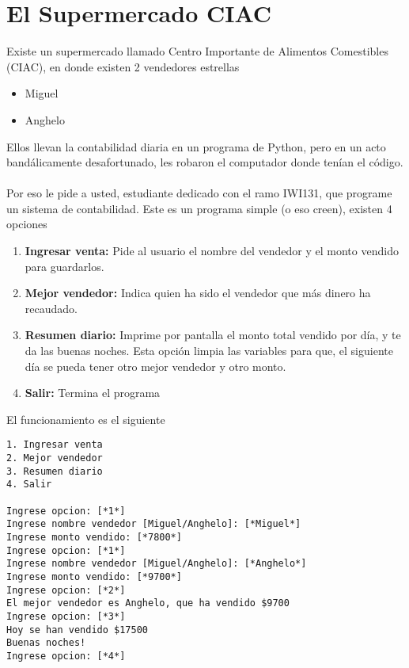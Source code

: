\section{El Supermercado CIAC}

Existe un supermercado llamado Centro Importante de Alimentos Comestibles (CIAC), en donde existen 2 vendedores estrellas
\begin{itemize}
    \item Miguel
    \item Anghelo
\end{itemize}

Ellos llevan la contabilidad diaria en un programa de Python, pero en un acto bandálicamente desafortunado, les robaron el computador donde tenían el código.
\\ \\   
Por eso le pide a usted, estudiante dedicado con el ramo IWI131, que programe un sistema de contabilidad. Este es un programa simple (o eso creen), existen 4 opciones

\begin{enumerate}
    \item \textbf{Ingresar venta:} Pide al usuario el nombre del vendedor y el monto vendido para guardarlos.
    \item \textbf{Mejor vendedor:} Indica quien ha sido el vendedor que más dinero ha recaudado.
    \item \textbf{Resumen diario:} Imprime por pantalla el monto total vendido por día, y te da las buenas noches. Esta opción limpia las variables para que, el siguiente día se pueda tener otro mejor vendedor y otro monto.
    \item \textbf{Salir:} Termina el programa
\end{enumerate}

El funcionamiento es el siguiente

\begin{lstlisting}[style=consola]
1. Ingresar venta
2. Mejor vendedor
3. Resumen diario
4. Salir

Ingrese opcion: [*1*]
Ingrese nombre vendedor [Miguel/Anghelo]: [*Miguel*]
Ingrese monto vendido: [*7800*]
Ingrese opcion: [*1*]
Ingrese nombre vendedor [Miguel/Anghelo]: [*Anghelo*]
Ingrese monto vendido: [*9700*]
Ingrese opcion: [*2*]
El mejor vendedor es Anghelo, que ha vendido $9700
Ingrese opcion: [*3*]
Hoy se han vendido $17500
Buenas noches!
Ingrese opcion: [*4*]
\end{lstlisting}
